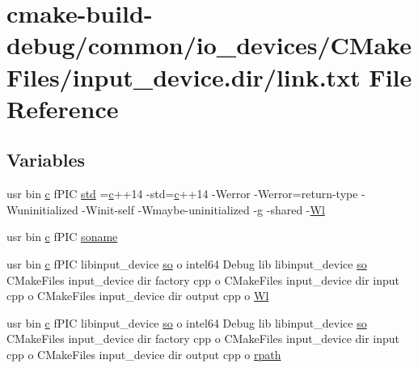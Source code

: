 \hypertarget{common_2io__devices_2CMakeFiles_2input__device_8dir_2link_8txt}{}\section{cmake-\/build-\/debug/common/io\+\_\+devices/\+C\+Make\+Files/input\+\_\+device.dir/link.txt File Reference}
\label{common_2io__devices_2CMakeFiles_2input__device_8dir_2link_8txt}
\subsection*{Variables}
\begin{DoxyCompactItemize}
\item 
usr bin \hyperlink{CMakeCache_8txt_aac1d6a1710812201527c735f7c6afbaa}{c} f\+P\+IC \hyperlink{common_2io__devices_2CMakeFiles_2input__device_8dir_2link_8txt_a5f87c8f8e33670f7c8c5221b6be1bcc4}{std} =\hyperlink{CMakeCache_8txt_aac1d6a1710812201527c735f7c6afbaa}{c}++14 -\/std=\hyperlink{CMakeCache_8txt_aac1d6a1710812201527c735f7c6afbaa}{c}++14 -\/Werror -\/Werror=return-\/type -\/Wuninitialized -\/Winit-\/self -\/Wmaybe-\/uninitialized -\/g -\/shared -\/\hyperlink{thirdparty_2extension_2CMakeFiles_2cpu__extension_8dir_2link_8txt_af9ccbf658ed2deb89d0d79f211e5b033}{Wl}
\item 
usr bin \hyperlink{CMakeCache_8txt_aac1d6a1710812201527c735f7c6afbaa}{c} f\+P\+IC \hyperlink{common_2io__devices_2CMakeFiles_2input__device_8dir_2link_8txt_ab65a9b6457c4853ed17f89f945516e66}{soname}
\item 
usr bin \hyperlink{CMakeCache_8txt_aac1d6a1710812201527c735f7c6afbaa}{c} f\+P\+IC libinput\+\_\+device \hyperlink{CMakeCache_8txt_aa98797039f48d335ee715de4cd92852f}{so} o intel64 Debug lib libinput\+\_\+device \hyperlink{CMakeCache_8txt_aa98797039f48d335ee715de4cd92852f}{so} C\+Make\+Files input\+\_\+device dir factory cpp o C\+Make\+Files input\+\_\+device dir input cpp o C\+Make\+Files input\+\_\+device dir output cpp o \hyperlink{common_2io__devices_2CMakeFiles_2input__device_8dir_2link_8txt_aad5ca2fe3b86a2487e5c97a706e2704e}{Wl}
\item 
usr bin \hyperlink{CMakeCache_8txt_aac1d6a1710812201527c735f7c6afbaa}{c} f\+P\+IC libinput\+\_\+device \hyperlink{CMakeCache_8txt_aa98797039f48d335ee715de4cd92852f}{so} o intel64 Debug lib libinput\+\_\+device \hyperlink{CMakeCache_8txt_aa98797039f48d335ee715de4cd92852f}{so} C\+Make\+Files input\+\_\+device dir factory cpp o C\+Make\+Files input\+\_\+device dir input cpp o C\+Make\+Files input\+\_\+device dir output cpp o \hyperlink{common_2io__devices_2CMakeFiles_2input__device_8dir_2link_8txt_ac4558f43940fe589b173f0b1a496c829}{rpath}
\end{DoxyCompactItemize}



